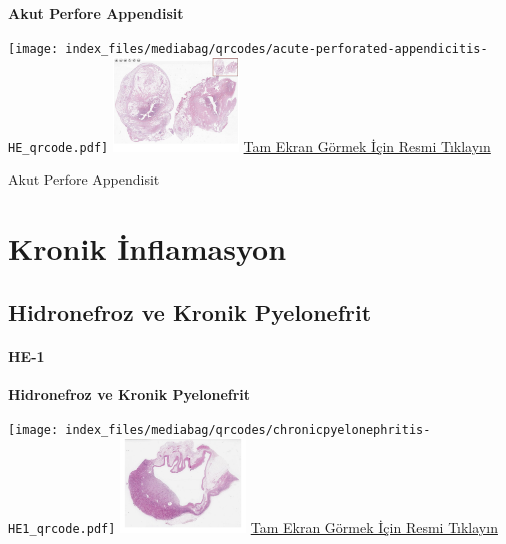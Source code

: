 \documentclass[
  letterpaper,
  DIV=11,
  numbers=noendperiod]{scrreprt}
\begin{document}
\textbf{Akut Perfore Appendisit}

\texttt{[image: index\_files/mediabag/qrcodes/acute-perforated-appendicitis-HE\_qrcode.pdf]}
\href{https://images.patolojiatlasi.com/acute-perforated-appendicitis/HE.html}{\includegraphics[width=0.25\textwidth,height=\textheight]{./screenshots/thumbnail_acute-perforated-appendicitis-HE.png}}
\href{https://images.patolojiatlasi.com/acute-perforated-appendicitis/HE.html}{Tam
Ekran Görmek İçin Resmi Tıklayın}

\begin{tcolorbox}[enhanced jigsaw, opacityback=0, breakable, titlerule=0mm, colback=white, toprule=.15mm, left=2mm, arc=.35mm, bottomtitle=1mm, toptitle=1mm, leftrule=.75mm, coltitle=black, rightrule=.15mm, colframe=quarto-callout-tip-color-frame, title=\textcolor{quarto-callout-tip-color}{\faLightbulb}\hspace{0.5em}{Tanı için tıklayın}, bottomrule=.15mm, opacitybacktitle=0.6, colbacktitle=quarto-callout-tip-color!10!white]

Akut Perfore Appendisit

\end{tcolorbox}

\chapter{Kronik İnflamasyon}\label{sec-kronik-inflamasyon}

\section{Hidronefroz ve Kronik
Pyelonefrit}\label{sec-hidronefroz-kronik-pyelonefrit}

\subsubsection{HE-1}\label{he-1-2}

\textbf{Hidronefroz ve Kronik Pyelonefrit}

\texttt{[image: index\_files/mediabag/qrcodes/chronicpyelonephritis-HE1\_qrcode.pdf]}
\href{https://images.patolojiatlasi.com/chronicpyelonephritis/HE1.html}{\includegraphics[width=0.25\textwidth,height=\textheight]{./screenshots/thumbnail_chronicpyelonephritis-1.png}}
\href{https://images.patolojiatlasi.com/chronicpyelonephritis/HE1.html}{Tam
Ekran Görmek İçin Resmi Tıklayın}
\end{document}
